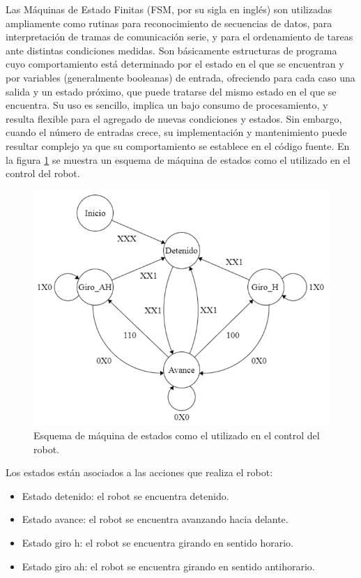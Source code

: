 Las Máquinas de Estado Finitas (FSM, por su sigla en inglés) \citep{FSMbook} son utilizadas ampliamente como rutinas para reconocimiento de secuencias de datos, para interpretación de tramas de comunicación serie, y para el ordenamiento de tareas ante distintas condiciones medidas. Son básicamente estructuras de programa cuyo comportamiento está determinado por el estado en el que se encuentran y por variables (generalmente booleanas) de entrada, ofreciendo para cada caso una salida y un estado próximo, que puede tratarse del mismo estado en el que se encuentra.
Su uso es sencillo, implica un bajo consumo de procesamiento, y resulta flexible para el agregado de nuevas condiciones y estados. Sin embargo, cuando el número de entradas crece, su implementación y mantenimiento puede resultar complejo ya que su comportamiento se establece en el código fuente. En la figura \ref{fig:estados} se muestra un esquema de máquina de estados como el utilizado en el control del robot.

\begin{figure}[h]
	\centering
	\includegraphics[width=12cm]{./Figures/estados.png}
	\caption{Esquema de máquina de estados como el utilizado en el control del robot.}
	\label{fig:estados}
\end{figure}


Los estados están asociados a las acciones que realiza el robot:
\begin{itemize}
	\item Estado detenido: el robot se encuentra detenido.
	\item Estado avance: el robot se encuentra avanzando hacia delante.
	\item Estado giro h: el robot se encuentra girando en sentido horario.
	\item Estado giro ah: el robot se encuentra girando en sentido antihorario.
\end{itemize}

